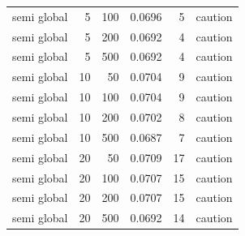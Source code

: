 \begin{table}[htbp]
\begin{tabular}{lrrrrl}
semi global & 5 & 100 & 0.0696 & 5 & caution \\
semi global & 5 & 200 & 0.0692 & 4 & caution \\
semi global & 5 & 500 & 0.0692 & 4 & caution \\
semi global & 10 & 50 & 0.0704 & 9 & caution \\
semi global & 10 & 100 & 0.0704 & 9 & caution \\
semi global & 10 & 200 & 0.0702 & 8 & caution \\
semi global & 10 & 500 & 0.0687 & 7 & caution \\
semi global & 20 & 50 & 0.0709 & 17 & caution \\
semi global & 20 & 100 & 0.0707 & 15 & caution \\
semi global & 20 & 200 & 0.0707 & 15 & caution \\
semi global & 20 & 500 & 0.0692 & 14 & caution \\
\bottomrule\end{tabular}\end{table}
